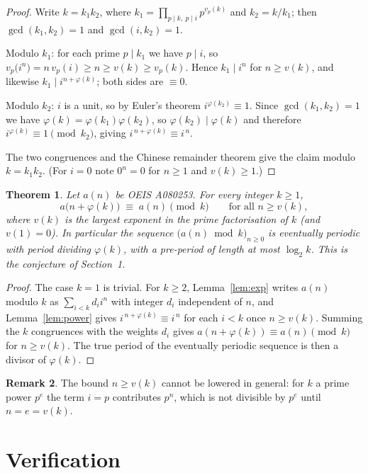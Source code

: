 \documentclass[11pt,a4paper]{article}
\theoremstyle{plain}
\newtheorem{theorem}{Theorem}
\theoremstyle{definition}
\newtheorem{remark}[theorem]{Remark}
\begin{document}
\begin{proof}
Write $k=k_1k_2$, where $k_1=\prod_{p\mid k,\ p\mid i}p^{v_p(k)}$ and $k_2=k/k_1$; then
$\gcd(k_1,k_2)=1$ and $\gcd(i,k_2)=1$.

Modulo $k_1$: for each prime $p\mid k_1$ we have $p\mid i$, so
$v_p\bigl(i^{n}\bigr)=n\,v_p(i)\ge n\ge v(k)\ge v_p(k)$. Hence $k_1\mid i^{n}$ for
$n\ge v(k)$, and likewise $k_1\mid i^{n+\varphi(k)}$; both sides are $\equiv 0$.

Modulo $k_2$: $i$ is a unit, so by Euler's theorem $i^{\varphi(k_2)}\equiv 1$. Since
$\gcd(k_1,k_2)=1$ we have $\varphi(k)=\varphi(k_1)\varphi(k_2)$, so
$\varphi(k_2)\mid\varphi(k)$ and therefore $i^{\varphi(k)}\equiv 1 \pmod{k_2}$, giving
$i^{\,n+\varphi(k)}\equiv i^{\,n}$.

The two congruences and the Chinese remainder theorem give the claim modulo $k=k_1k_2$.
(For $i=0$ note $0^{n}=0$ for $n\ge 1$ and $v(k)\ge1$.)
\end{proof}

\begin{theorem}\label{thm:main}
Let $a(n)$ be OEIS A080253. For every integer $k\ge1$,
\[
a\bigl(n+\varphi(k)\bigr)\;\equiv\;a(n)\pmod{k}\qquad\text{for all } n\ge v(k),
\]
where $v(k)$ is the largest exponent in the prime factorisation of $k$ (and $v(1)=0$).
In particular the sequence $\bigl(a(n)\bmod k\bigr)_{n\ge0}$ is eventually periodic with
period dividing $\varphi(k)$, with a pre-period of length at most $\log_2 k$. This is the
conjecture of Section~1.
\end{theorem}

\begin{proof}
The case $k=1$ is trivial. For $k\ge2$, Lemma~\ref{lem:exp} writes $a(n)$ modulo $k$ as
$\sum_{i<k}d_i i^{n}$ with integer $d_i$ independent of $n$, and Lemma~\ref{lem:power}
gives $i^{\,n+\varphi(k)}\equiv i^{\,n}$ for each $i<k$ once $n\ge v(k)$. Summing the
$k$ congruences with the weights $d_i$ gives
$a(n+\varphi(k))\equiv a(n)\pmod k$ for $n\ge v(k)$. The true period of the eventually
periodic sequence is then a divisor of $\varphi(k)$.
\end{proof}

\begin{remark}
The bound $n\ge v(k)$ cannot be lowered in general: for $k$ a prime power $p^{e}$ the
term $i=p$ contributes $p^{n}$, which is not divisible by $p^{e}$ until $n=e=v(k)$.
\end{remark}

\section{Verification}
\end{document}
